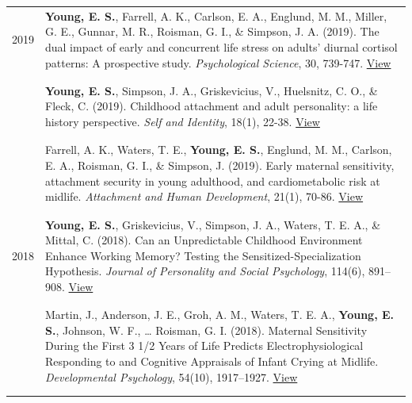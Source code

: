 \documentclass[
]{article}
\begin{document}
\begin{longtable}{p{2.25cm}p{5.5in}}
2019 & \hangindent=0.25cm \textbf{Young, E. S.}, Farrell, A. K., Carlson, E. A., Englund, M. M., Miller, G. E., Gunnar, M. R., Roisman, G. I., \& Simpson, J. A. (2019). The dual impact of early and concurrent life stress on adults’ diurnal cortisol patterns: A prospective study. \textit{Psychological Science}, 30, 739-747. \newline \href{https://www.ethan-young.com/publications/journal/2019_PS_Young.pdf}{\textcolor{downloadcolor}{\faFilePdfO{} View}} \\ \\& \\[-1.5em]
 & \hangindent=0.25cm \textbf{Young, E. S.}, Simpson, J. A., Griskevicius, V., Huelsnitz, C. O., \& Fleck, C. (2019). Childhood attachment and adult personality: a life history perspective. \textit{Self and Identity}, 18(1), 22-38. \newline \href{https://www.ethan-young.com/publications/journal/2019_SI_Young.pdf}{\textcolor{downloadcolor}{\faFilePdfO{} View}} \\ \\& \\[-1.5em]
 & \hangindent=0.25cm Farrell, A. K., Waters, T. E., \textbf{Young, E. S.}, Englund, M. M., Carlson, E. A., Roisman, G. I., \& Simpson, J. (2019). Early maternal sensitivity, attachment security in young adulthood, and cardiometabolic risk at midlife. \textit{Attachment and Human Development}, 21(1), 70-86. \newline \href{https://www.ethan-young.com/publications/journal/2019_AHD_Farrell.pdf}{\textcolor{downloadcolor}{\faFilePdfO{} View}} \\ \\& \\[-1.5em]
2018 & \hangindent=0.25cm \textbf{Young, E. S.}, Griskevicius, V., Simpson, J. A., Waters, T. E. A., \& Mittal, C. (2018). Can an Unpredictable Childhood Environment Enhance Working Memory? Testing the Sensitized-Specialization Hypothesis. \textit{Journal of Personality and Social Psychology}, 114(6), 891–908. \newline \href{https://www.ethan-young.com/publications/journal/2018_JPSP_Young.pdf}{\textcolor{downloadcolor}{\faFilePdfO{} View}} \\ \\& \\[-1.5em]
 & \hangindent=0.25cm Martin, J., Anderson, J. E., Groh, A. M., Waters, T. E. A., \textbf{Young, E. S.}, Johnson, W. F., … Roisman, G. I. (2018). Maternal Sensitivity During the First 3 1/2 Years of Life Predicts Electrophysiological Responding to and Cognitive Appraisals of Infant Crying at Midlife. \textit{Developmental Psychology}, 54(10), 1917–1927. \newline \href{https://www.ethan-young.com/publications/journal/2018_DP_Martin.pdf}{\textcolor{downloadcolor}{\faFilePdfO{} View}} \\ \\& \\[-1.5em]

\end{longtable}
\end{document}
